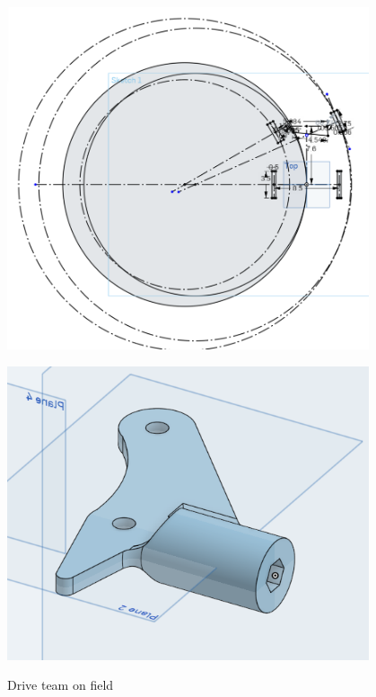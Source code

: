  

\begin{figure}[ht]
\centering
\begin{minipage}[b]{.48\textwidth}
  \centering
  \includegraphics[width=0.95\textwidth]{Meetings/September/09-28-22/9-28-22_CAD_Figure1.PNG}
  \caption{Drive team on field}
  \label{fig:pic1}
\end{minipage}%
\hfill%
\begin{minipage}[b]{.48\textwidth}
  \centering
  \includegraphics[width=0.95\textwidth]{Meetings/September/09-28-22/9-28-22_CAD_Figure2.PNG}
  \label{fig:pic2}
\end{minipage}
\end{figure}

